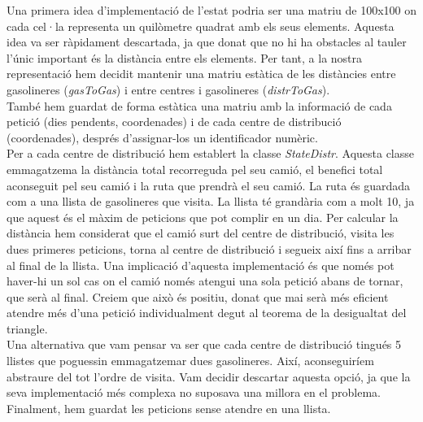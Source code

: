 \documentclass[a4paper]{article}
\begin{document}
Una primera idea d'implementació de l'estat podria ser una matriu de 100x100 on cada cel·la representa un quilòmetre quadrat amb els seus elements. Aquesta idea va ser ràpidament descartada, ja que donat que no hi ha obstacles al tauler l'únic important és la distància entre els elements. Per tant, a la nostra representació hem decidit mantenir una matriu estàtica de les distàncies entre gasolineres (\emph{gasToGas}) i entre centres i gasolineres (\emph{distrToGas}).\\

També hem guardat de forma estàtica una matriu amb la informació de cada petició (dies pendents, coordenades) i de cada centre de distribució (coordenades), després d'assignar-los un identificador numèric.\\

Per a cada centre de distribució hem establert la classe \emph{StateDistr}. Aquesta classe emmagatzema la distància total recorreguda pel seu camió, el benefici total aconseguit pel seu camió i la ruta que prendrà el seu camió. La ruta és guardada com a una llista de gasolineres que visita. La llista té grandària com a molt 10, ja que aquest és el màxim de peticions que pot complir en un dia. Per calcular la distància hem considerat que el camió surt del centre de distribució, visita les dues primeres peticions, torna al centre de distribució i segueix així fins a arribar al final de la llista. Una implicació d'aquesta implementació és que només pot haver-hi un sol cas on el camió només atengui una sola petició abans de tornar, que serà al final. Creiem que això és positiu, donat que mai serà més eficient atendre més d'una petició individualment degut al teorema de la desigualtat del triangle.\\

Una alternativa que vam pensar va ser que cada centre de distribució tingués 5 llistes que poguessin emmagatzemar dues gasolineres. Així, aconseguiríem abstraure del tot l'ordre de visita. Vam decidir descartar aquesta opció, ja que la seva implementació més complexa no suposava una millora en el problema.\\

Finalment, hem guardat les peticions sense atendre en una llista.\\
\end{document}

